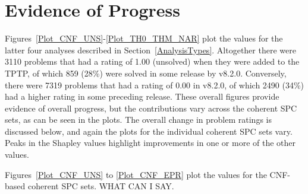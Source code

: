 \documentclass[runningheads]{llncs}
\begin{document}
\section{Evidence of Progress}
\label{Evidence}

Figures~\ref{Plot_CNF_UNS}-\ref{Plot_TH0_THM_NAR} plot the values for the latter four analyses
described in Section~\ref{AnalysisTypes}.
Altogether there were 3110 problems that had a rating of 1.00 (unsolved) when they were added to
the TPTP, of which 859 (28\%) were solved in some release by v8.2.0. 
Conversely, there were 7319 problems that had a rating of 0.00 in v8.2.0, of which 2490 (34\%) 
had a higher rating in some preceding release.
These overall figures provide evidence of overall progress, but the contributions vary across
the coherent SPC sets, as can be seen in the plots.
The overall change in problem ratings is discussed below, and again the plots for the individual
coherent SPC sets vary.
Peaks in the Shapley values highlight improvements in one or more of the other values.

Figures~\ref{Plot_CNF_UNS} to \ref{Plot_CNF_EPR} plot the values for the CNF-based coherent 
SPC sets.
WHAT CAN I SAY.
\end{document}

